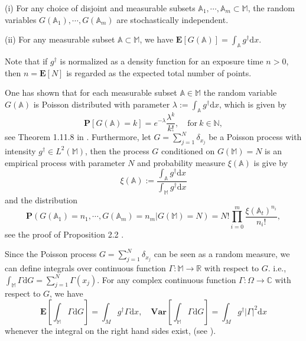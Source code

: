 \documentclass[10pt]{iopart}
\begin{document}
(i) For any choice of disjoint and measurable subsets $\mathbb{A}_{1}, \cdots, \mathbb{A}_{m}\subset\mathbb{M}$, the random variables 
$G(\mathbb{A}_{1}), \cdots, G(\mathbb{A}_{m})$ are stochastically independent.

(ii) For any measurable subset $\mathbb{A}\subset\mathbb{M}$, we have $\mathbf{E}[G(\mathbb{A})]=\int_{\mathbb{A}}g^{\dagger}\mathrm{d}x$. 

Note that if $g^{\dagger}$ is normalized as a density function for an 
exposure time $n>0$, then $n=\mathbf{E}[N]$ is regarded as the expected total number of points.

One has shown that for each measurable subset $\mathbb{A}\in\mathbb{M}$ the random variable $G(\mathbb{A})$ is Poisson distributed
with parameter $\lambda:= \int_{\mathbb{A}} g^{\dagger}\mathrm{d}x$, which is given by
\begin{equation*}
\mathbf{P}[G(\mathbb{A})=k]=e^{-\lambda}\frac{\lambda^{k}}{k!}, \quad\text{for}~ k\in\mathbb{N},
\end{equation*}
see Theorem 1.11.8 in \cite{kingman1993}.  Furthermore, let $G=\sum_{j=1}^{N}\delta_{x_{j}}$ be a Poisson process with intensity
$g^{\dagger}\in L^{2}(\mathbb{M})$, then the process $G$ conditioned on $G(\mathbb{M})=N$ is an empirical process with parameter $N$
and probability measure $\xi(\mathbb{A})$ is give by
\begin{equation*}
\xi(\mathbb{A}):=\frac{\int_{\mathbb{A}}g^{\dagger}\mathrm{d}x}{\int_{\mathbb{M}}g^{\dagger}\mathrm{d}x}
\end{equation*}
and the distribution 
\begin{equation*}
\mathbf{P}(G(\mathbb{A}_{1})=n_{1}, \cdots, G(\mathbb{A}_{m})=n_{m}|G(\mathbb{M})=N)=N!\prod_{i=0}^{m}
\frac{\xi(\mathbb{A}_{t})^{n_{i}}}{n_{i}!},
\end{equation*}
see the proof of Proposition 2.2 \cite{Hohage2016}. 

Since the Poisson process $G=\sum_{j=1}^{N}\delta_{x_{j}}$ can be seen as a random measure, we can define integrals over continuous function
$\Gamma: \mathbb{M}\rightarrow \mathbb{R}$ with respect to $G$. i.e., $\int_{\mathbb{M}}\Gamma\mathrm{d}G=\sum_{j=1}^{N}\Gamma(x_{j})$.
For any complex continuous function $\Gamma: \Omega\rightarrow \mathbb{C}$ with respect to $G$, we have
\begin{equation}\label{4}
\mathbf{E}\left[\int_{\mathbb{M}}\Gamma\mathrm{d}G\right]=\int_{M} g^{\dagger}\Gamma\mathrm{d}x, \quad \mathbf{Var}
\left[\int_{\mathbb{M}}\Gamma\mathrm{d}G\right]=\int_{M} g^{\dagger}|\Gamma|^{2}\mathrm{d}x
\end{equation}
whenever the integral on the right hand sides exist, (see \cite{kingman1993}).
\end{document}
